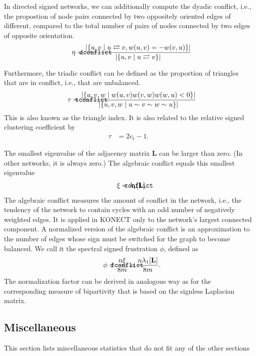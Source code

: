 \documentclass{article}
\def\mathnote#1{%
  \tag*{\rlap{\hspace\marginparsep\smash{\parbox[t]{\marginparwidth}{#1}}}}
}
\begin{document}
In directed signed networks, we can additionally compute the dyadic
conflict, i.e., the propostion of node pairs connected by two oppositely
oriented edges of different, compared to the total number of pairs of
nodes connected by two edges of opposite orientation. 
\begin{align}
  \mathnote{\texttt{dconflict}}
  \eta &= \frac 
       {|\{ u,v \mid u \rightleftarrows v, w(u,v) = - w(v,u) \}|} 
       {|\{ u, v \mid u \rightleftarrows v \}|}
\end{align}

Furthermore, the triadic conflict can be defined as the proportion of
triangles that are in conflict, i.e., that are unbalanced. 
\begin{align}
  \mathnote{\texttt{tconflict}}  
  \tau &= \frac 
  {|\{ u, v, w \mid w(u, v) w(v, w) w(w, u) < 0\}|}
  {|\{ u, v, w \mid u \sim v \sim w \sim u \}|}
\end{align}
This is also known as the triangle index.
It is also related to the relative signed clustering coefficient by
\begin{align}
\tau &= 2 c_{\mathrm r} - 1.
\end{align}

The smallest eigenvalue of the adjacency matrix $\mathbf L$ can
be larger than zero.  (In other networks, it is always zero.) The
algebraic conflict equals this smallest eigenvalue
\begin{align}
  \mathnote{\texttt{conflict}} 
  \xi &= \lambda_1[\mathbf L].
\end{align}
The algebraic conflict measures the amount of conflict in the network,
i.e., the tendency of the network to contain cycles with an odd number
of negatively weighted edges.  It is applied in KONECT only to the
network's largest connected component. 
A normalized version of the algebraic conflict is an approximation to
the number of edges whose sign must be switched for the graph to become
balanced.  We call it the spectral signed frustration $\phi$, defined as
\begin{align}
  \mathnote{\texttt{fconflict}}
  \phi &= \frac{n \xi}{8 m} = \frac{n \lambda_1[\mathbf L]}{8m}.
\end{align}
The normalization factor can be derived in analogous way as for the
corresponding measure of bipartivity that is based on the signless
Laplacian matrix. 

\subsection{Miscellaneous}
This section lists miscellaneous statistics that do not fit any of the
other sections
\end{document}
